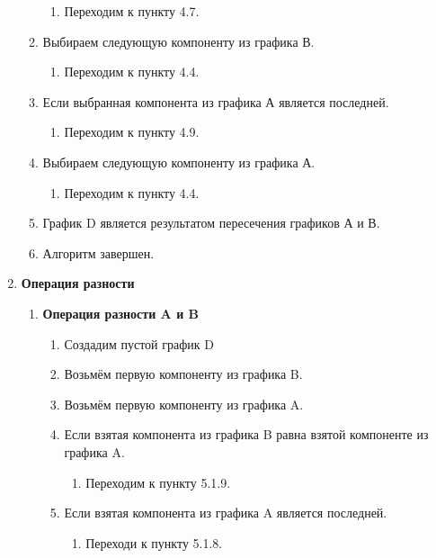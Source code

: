 \documentclass[a4paper,12pt]{extarticle}
\begin{document}
\begin{enumerate}
\begin{enumerate}[label*=\arabic*.]
    \begin{enumerate}[label*=\arabic*.]
      \item Переходим к пункту 4.7.
    \end{enumerate}
    \item Выбираем следующую компоненту из графика В.
    \begin{enumerate}[label*=\arabic*.]
      \item Переходим к пункту 4.4.
    \end{enumerate}
    \item Если выбранная компонента из графика А является последней.
    \begin{enumerate}[label*=\arabic*.]
      \item Переходим к пункту 4.9.
    \end{enumerate}
    \item Выбираем следующую компоненту из графика А.
    \begin{enumerate}[label*=\arabic*.]
      \item Переходим к пункту 4.4.
    \end{enumerate}
    \item График D является результатом пересечения графиков А и В.
    \item Алгоритм завершен.
  \end{enumerate}
  \item \textbf{Операция разности}
  \begin{enumerate}[label*=\arabic*.]
  \item \textbf{Операция разности A и B}
  \begin{enumerate}[label*=\arabic*.]
    \item Создадим пустой график D
    \item Возьмём первую компоненту из графика B.
    \item Возьмём первую компоненту из графика A.
    \item Если взятая компонента из графика B равна взятой компоненте из графика A.
    \begin{enumerate}[label*=\arabic*.]
      \item Переходим к пункту 5.1.9.
    \end{enumerate}
    \item Если взятая компонента из графика A является последней.
    \begin{enumerate}[label*=\arabic*.]
      \item Переходи к пункту 5.1.8.
    \end{enumerate}

\end{enumerate}
\end{enumerate}
\end{enumerate}
\end{document}

